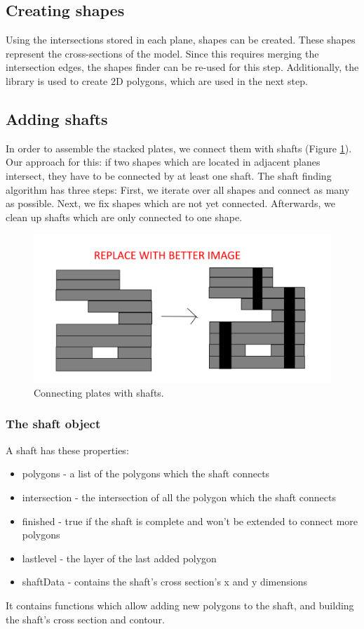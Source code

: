 \documentclass[../ClassicThesis.tex]{subfiles}
\begin{document}
\subsection{Creating shapes}

Using the intersections stored in each plane, shapes can be created. These shapes represent the cross-sections of the model. Since this requires merging the intersection edges, the shapes finder can be re-used for this step. Additionally, the \jsclipper library is used to create 2D polygons, which are used in the next step.

\subsection{Adding shafts}

In order to assemble the stacked plates, we connect them with shafts (Figure \ref{fig:shafts}). Our approach for this: if two shapes which are located in adjacent planes intersect, they have to be connected by at least one shaft. The shaft finding algorithm has three steps: First, we iterate over all shapes and connect as many as possible. Next, we fix shapes which are not yet connected. Afterwards, we clean up shafts which are only connected to one shape.

\begin{figure}
    \includegraphics[width=1.0\columnwidth]{Images/plates_shafts.png}
    \caption{Connecting plates with shafts.}
    \label{fig:shafts}
\end{figure}

\subsubsection{The shaft object}

A shaft has these properties:
\begin{itemize}
    \item polygons - a list of the polygons which the shaft connects
    \item intersection - the intersection of all the polygon which the shaft connects
    \item finished - true if the shaft is complete and won't be extended to connect more polygons
    \item lastlevel - the layer of the last added polygon
    \item shaftData - contains the shaft's cross section's x and y dimensions
\end{itemize}
It contains functions which allow adding new polygons to the shaft, and building the shaft's cross section and contour.
\end{document}
